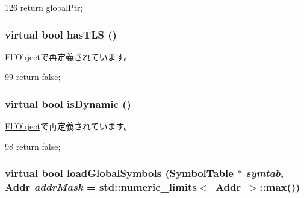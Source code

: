 \begin{DoxyCode}
126 { return globalPtr; }
\end{DoxyCode}
\hypertarget{classObjectFile_a1ed34e505be8c6dabe578012e35a0317}{
\subsubsection[{hasTLS}]{\setlength{\rightskip}{0pt plus 5cm}virtual bool hasTLS ()}}
\label{classObjectFile_a1ed34e505be8c6dabe578012e35a0317}


\hyperlink{classElfObject_a1ed34e505be8c6dabe578012e35a0317}{ElfObject}で再定義されています。


\begin{DoxyCode}
99 { return false; }
\end{DoxyCode}
\hypertarget{classObjectFile_adeb3f3d68421f3e5f75dbbdf998a21ac}{
\subsubsection[{isDynamic}]{\setlength{\rightskip}{0pt plus 5cm}virtual bool isDynamic ()}}
\label{classObjectFile_adeb3f3d68421f3e5f75dbbdf998a21ac}


\hyperlink{classElfObject_adeb3f3d68421f3e5f75dbbdf998a21ac}{ElfObject}で再定義されています。


\begin{DoxyCode}
98 { return false; }
\end{DoxyCode}
\hypertarget{classObjectFile_abd8b86c98494f055ba7e0babbd55f4a0}{
\subsubsection[{loadGlobalSymbols}]{\setlength{\rightskip}{0pt plus 5cm}virtual bool loadGlobalSymbols ({\bf SymbolTable} $\ast$ {\em symtab}, \/  {\bf Addr} {\em addrMask} = {\ttfamily std::numeric\_\-limits$<$~{\bf Addr}~$>$::max()})}}
\label{classObjectFile_abd8b86c98494f055ba7e0babbd55f4a0}


